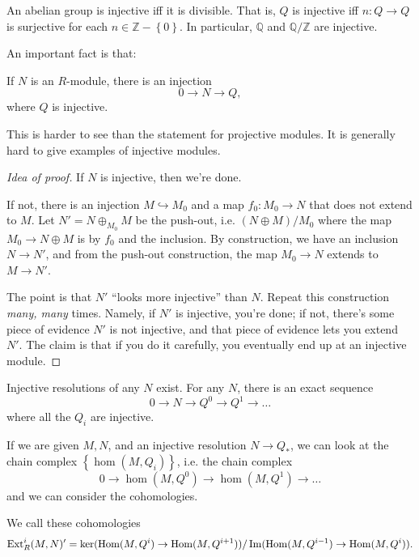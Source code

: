 \begin{example} 
An abelian group is injective iff it is divisible. That is, $Q$
is injective
iff $n: Q \to Q$ is surjective for each $n \in \mathbb{Z} -
\left\{0\right\}$.
In particular, $\mathbb{Q}$ and $\mathbb{Q}/\mathbb{Z}$ are
injective.
\end{example} 

An important fact is that:

\begin{proposition} 
If $N$ is an $R$-module, there is an injection
\[ 0 \to N \to Q,  \]
where $Q$ is injective.
\end{proposition} 
This is harder to see than the statement for projective modules.
It is
generally hard to give examples of injective modules.
\begin{proof}[Idea of proof] If $N$ is injective, then we're
done.

If not, there is an injection $M \hookrightarrow M_0$ and a map
$f_0: M_0 \to N$
that does not extend to $M$. Let $N' = N \oplus_{M_0} M$ be the
push-out, i.e.
$(N \oplus M)/M_0$ where the map $M_0 \to N \oplus M$ is by
$f_0$ and the
inclusion. By construction, we have an inclusion $N \to N'$, and
from the
push-out construction, the map $M_0 \to N$ extends to $M \to
N'$.

The point is that $N'$ ``looks more injective'' than $N$. Repeat
this
construction \emph{many, many} times. Namely, if $N'$ is
injective, you're
done; if not, there's some piece of evidence $N'$ is not
injective, and that
piece of evidence lets you extend $N'$. The claim is that if you
do it
carefully, you eventually end up at an injective module. 

\end{proof} 


\begin{corollary} 
Injective resolutions of any $N$ exist. For any $N$, there is an
exact sequence
\[ 0 \to N \to Q^0 \to Q^1 \to \dots  \]
where all the $Q_i$ are injective.
\end{corollary} 

If we are given $M,N$, and an injective resolution $N \to Q_*$,
we can look at
the chain complex $\left\{\hom(M,Q_i)\right\}$, i.e. the chain
complex
\[ 0 \to \hom(M, Q^0) \to \hom(M, Q^1) \to \dots  \]
and we can consider the cohomologies.

\begin{definition} 
We call these cohomologies
\[ \mathrm{Ext}^i_R(M,N)' = \ker(\operatorname{Hom}(M, Q^i) \to \operatorname{Hom}(M,
Q^{i+1}))/\operatorname{Im}(\operatorname{Hom}(M,
Q^{i-1}) \to \operatorname{Hom}(M, Q^i)).  \]
\end{definition} 

